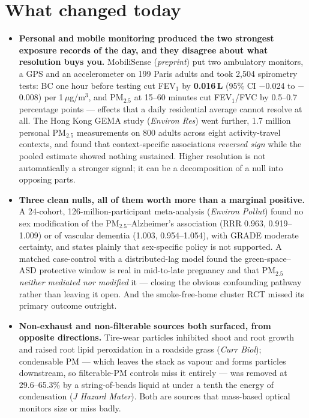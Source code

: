 \documentclass[10pt]{article}
\begin{document}
\vspace{3mm}

\section*{\sffamily\bfseries\color{Deep}What changed today}
\vspace{-1.5mm}{\color{Amber}\rule{\linewidth}{1.1pt}}\vspace{2.5mm}

\footnotesize
\begin{itemize}
\item \textbf{Personal and mobile monitoring produced the two strongest exposure records
of the day, and they disagree about what resolution buys you.} MobiliSense
(\textit{preprint}) put two ambulatory monitors, a GPS and an accelerometer on 199 Paris
adults and took 2{,}504 spirometry tests: BC one hour before testing cut FEV$_1$ by
\textbf{0.016\,L} (95\% CI $-$0.024 to $-$0.008) per 1\,$\mu$g/m$^3$, and PM$_{2.5}$ at
15--60 minutes cut FEV$_1$/FVC by 0.5--0.7 percentage points --- effects that a daily
residential average cannot resolve at all. The Hong Kong GEMA study
(\textit{Environ Res}) went further, 1.7 million personal PM$_{2.5}$ measurements on 800
adults across eight activity-travel contexts, and found that context-specific
associations \emph{reversed sign} while the pooled estimate showed nothing sustained.
Higher resolution is not automatically a stronger signal; it can be a decomposition of a
null into opposing parts.

\item \textbf{Three clean nulls, all of them worth more than a marginal positive.}
A 24-cohort, 126-million-participant meta-analysis (\textit{Environ Pollut}) found no sex
modification of the PM$_{2.5}$--Alzheimer's association (RRR 0.963, 0.919--1.009) or of
vascular dementia (1.003, 0.954--1.054), with GRADE moderate certainty, and states
plainly that sex-specific policy is not supported. A matched case-control with a
distributed-lag model found the green-space--ASD protective window is real in mid-to-late
pregnancy and that PM$_{2.5}$ \emph{neither mediated nor modified} it --- closing the
obvious confounding pathway rather than leaving it open. And the smoke-free-home cluster
RCT missed its primary outcome outright.

\item \textbf{Non-exhaust and non-filterable sources both surfaced, from opposite
directions.} Tire-wear particles inhibited shoot and root growth and raised root lipid
peroxidation in a roadside grass (\textit{Curr Biol}); condensable PM --- which leaves the
stack as vapour and forms particles downstream, so filterable-PM controls miss it entirely
--- was removed at 29.6--65.3\% by a string-of-beads liquid at under a tenth the energy of
condensation (\textit{J Hazard Mater}). Both are sources that mass-based optical monitors
size or miss badly.


\end{itemize}
\end{document}
